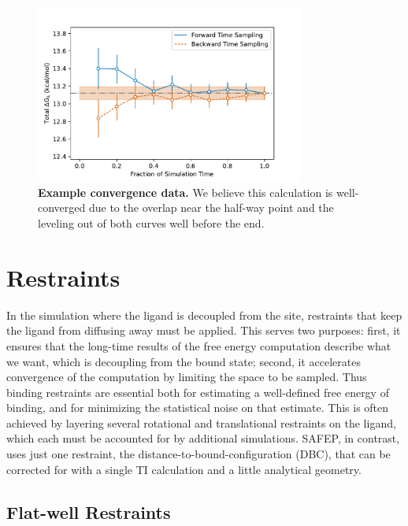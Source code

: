 \documentclass[9pt,tutorial]{Styling/livecoms}
\begin{document}
\begin{figure}[hb]
    \centering
    \includegraphics[width=250pt]{"good_convergence"}
    \caption{\textbf{Example convergence data.} We believe this calculation is well-converged due to the overlap near the half-way point and the leveling out of both curves well before the end. 
    }\label{fig:convergenceExample}
\end{figure}

\section{Restraints}\label{app:restraints}
In the simulation where the ligand is decoupled from the site, restraints that keep the ligand from diffusing away must be applied. This serves two purposes:\cite{Hermans1986} first, it ensures that the long-time results of the free energy computation describe what we want, which is decoupling from the bound state; second, it accelerates convergence of the computation by limiting the space to be sampled.
Thus binding restraints are essential both for estimating a well-defined free energy of binding, and for minimizing the statistical noise on that estimate.
This is often achieved by layering several rotational and translational restraints on the ligand, which each must be accounted for by additional simulations.\cite{Hermans1997, Gilson1997, Boresch2003, Hamelberg2004, Woo2005, Deng2006}
SAFEP, in contrast, uses just one restraint, the distance-to-bound-configuration (DBC), that can be corrected for with a single TI calculation and a little analytical geometry.\cite{Salari2018}

\subsection{Flat-well Restraints}
\end{document}

